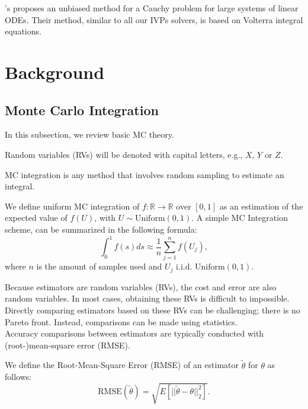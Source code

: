 \documentclass[a4paper,12pt]{article}
\begin{document}
\citeauthor{ermakov_monte_2021}'s \citeyear{ermakov_monte_2021} \cite{ermakov_monte_2021} proposes
an unbiased method for a Cauchy problem for large systems of linear ODEs. Their method, similar
to all our IVPs solvers, is based on Volterra integral equations.

\section{Background}

\subsection{Monte Carlo Integration}

In this subsection, we review basic MC theory. \\

\begin{notation}
  Random variables (RVs) will be denoted with capital letters, e.g., $X$, $Y$ or $Z$.
\end{notation}


MC integration is any method that involves random sampling to
estimate an integral.
\begin{definition}
  We define uniform MC integration of
  $f:\mathbb{R} \rightarrow \mathbb{R}$
  over $[0,1]$ as
  an estimation of the expected value of $f(U)$, with
  $U \sim \text{Uniform}(0,1)$. A simple MC Integration
  scheme, can be summarized in the following formula:
  \begin{equation}\label{eq:BLUE}
    \int_{0}^1 f(s)ds \approx \frac{1}{n} \sum_{j=1}^{n}f(U_{j}),
  \end{equation}
  where $n$ is the amount of samples used and $U_{j}$ i.i.d. $\text{Uniform}(0,1)$.
\end{definition}

Because estimators are random variables (RVs), the cost and error are also random
variables. In most cases, obtaining these RVs is difficult to impossible.
Directly comparing estimators based on these RVs can be challenging;
there is no Pareto front. Instead, comparisons can be made
using statistics. \\

Accuracy comparisons between estimators
are typically conducted with (root-)mean-square error (RMSE).
\begin{definition}
  We define the Root-Mean-Square Error (RMSE) of an estimator $\tilde{\theta}$ for $\theta$  as follows:
  \begin{equation}
    \text{RMSE}(\tilde{\theta}) = \sqrt{E[||\tilde{\theta}-\theta||^{2}_{2}]}.
  \end{equation}
\end{definition}
\end{document}
